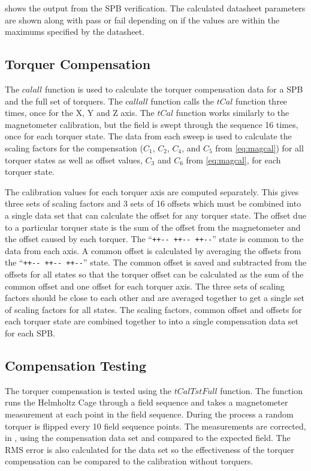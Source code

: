  shows the output from the \ac{SPB} verification. The calculated datasheet parameters are shown along with pass or fail depending on if the values are within the maximums specified by the datasheet.


\subsection{Torquer Compensation}

\label{sec:tst-tq-comp}

The \lstMat$calall$ function is used to calculate the torquer compensation data for a \ac{SPB} and the full set of torquers. The \lstMat$callall$ function calls the \lstMat$tCal$ function three times, once for the X, Y and Z axis. The \lstMat$tCal$ function works similarly to the magnetometer calibration, but the field is swept through the sequence 16 times, once for each torquer state. The data from each sweep is used to calculate the scaling factors for the compensation ($C_1$, $C_2$, $C_4$, and $C_5$ from \cref{eq:magcal}) for all torquer states as well as offset values, $C_3$ and $C_6$ from \cref{eq:magcal}, for each torquer state.

The calibration values for each torquer axis are computed separately. This gives three sets of scaling factors and 3 sets of 16 offsets which must be combined into a single data set that can calculate the offset for any torquer state. The offset due to a particular torquer state is the sum of the offset from the magnetometer and the offset caused by each torquer. The \enquote{\texttt{++-{}- ++-{}- ++-{}-}} state is common to the data from each axis. A common offset is calculated by averaging the offsets from the \enquote{\texttt{++-{}- ++-{}- ++-{}-}} state. The common offset is saved and subtracted from the offsets for all states so that the torquer offset can be calculated as the sum of the common offset and one offset for each torquer axis. The three sets of scaling factors should be close to each other and are averaged together to get a single set of scaling factors for all states. The scaling factors, common offset and offsets for each torquer state are combined together to into a single compensation data set for each \ac{SPB}.

\subsection{Compensation Testing}
\label{sec:tq-comp-tst}

The torquer compensation is tested using the \lstMat$tCalTstFull$ function. The function runs the Helmholtz Cage through a field sequence and takes a magnetometer measurement at each point in the field sequence. During the process a random torquer is flipped every 10 field sequence points. The measurements are corrected, in \matlab, using the compensation data set and compared to the expected field. The RMS error is also calculated for the data set so the effectiveness of the torquer compensation can be compared to the calibration without torquers.

